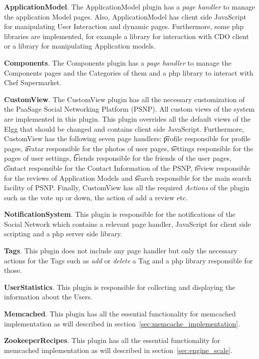 \textbf{ApplicationModel}. The ApplicationModel plugin has a {\it page handler} to manage the application Model pages. Also, ApplicationModel has client side JavaScript for manipulating User Interaction and dynamic pages. Furthermore, some php libraries are implemented, for example a library for interaction with CDO client or a library for manipulating Application models. 

\textbf{Components}. The Components plugin has a {\it page handler} to manage the Components pages and the Categories of them and a php library to interact with Chef Supermarket.

\textbf{CustomView}. The CustomView plugin has all the necessary customization of the PaaSage Social Networking Platform (PSNP). All custom views of the system are implemented in this plugin. This plugin overrides all the default views of the Elgg that should be changed and contains client side JavaScript. Furthermore, CustomView has the following seven page handlers: {\t profile} responsible for profile pages, {\t avatar} responsible for the photos of user pages, {\t settings} responsible for the pages of user settings, {\t friends} responsible for the friends of the user pages, {\t contact} responsible for the Contact Information of the PSNP, {\t review} responsible for the reviews of Application Models and {\t search} responsible for the main search facility of PSNP. Finally, CustomView has all the required \emph{Actions} of the plugin such as the vote up or down, the action of add a review etc.

\textbf{NotificationSystem}. This plugin is responsible for the notifications of the Social Network which contains a relevant page handler, JavaScript for client side scripting and a php server side library.

\textbf{Tags}. This plugin does not include any page handler but only the necessary actions for the Tags such as {\it add} or {\it delete} a Tag and a php library responsible for those. 

\textbf{UserStatistics}. This plugin is responsible for collecting and displaying the information about the Users.

\textbf{Memcached}. This plugin has all the essential functionality for memcached implementation as will described in section~\ref{sec:memcache_implementation}.

\textbf{ZookeeperRecipes}. This plugin has all the essential functionality for memcached implementation as will described in section~\ref{sec:engine_scale}.

